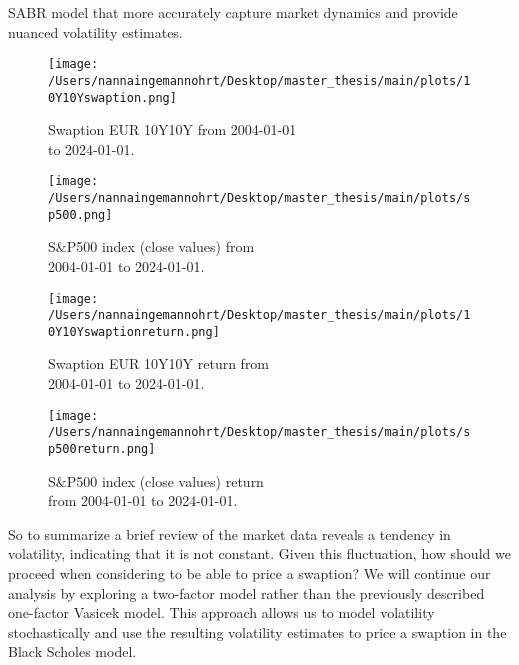 SABR model that more accurately capture market dynamics and provide nuanced volatility estimates.
\begin{figure}[H]
    \centering
    \begin{minipage}{0.5\textwidth}
        \texttt{[image: /Users/nannaingemannohrt/Desktop/master\_thesis/main/plots/10Y10Yswaption.png]}
        \caption{Swaption EUR 10Y10Y from  2004-01-01 \\ to 2024-01-01.}
        \label{10Y10Y dev}
    \end{minipage}\hfill 
    \begin{minipage}{0.5\textwidth}
        \texttt{[image: /Users/nannaingemannohrt/Desktop/master\_thesis/main/plots/sp500.png]}
        \caption{S$\&$P500 index (close values) from \\ 2004-01-01 to 2024-01-01.}
        \label{sp500 dev}
    \end{minipage}
\end{figure}

\begin{figure}[H]
    \centering
    \begin{minipage}{0.5\textwidth}
        \texttt{[image: /Users/nannaingemannohrt/Desktop/master\_thesis/main/plots/10Y10Yswaptionreturn.png]}
        \caption{Swaption EUR 10Y10Y return from  \\ 2004-01-01 to 2024-01-01.}
        \label{10Y10Y return}
    \end{minipage}\hfill 
    \begin{minipage}{0.5\textwidth}
        \texttt{[image: /Users/nannaingemannohrt/Desktop/master\_thesis/main/plots/sp500return.png]}
        \caption{S$\&$P500 index (close values) return  \\ from 2004-01-01 to 2024-01-01.}
        \label{sp500 return}
    \end{minipage}
\end{figure}
\noindent
So to summarize a brief review of the market data reveals a tendency in 
volatility, indicating that it is not constant. 
Given this fluctuation, how should we proceed when 
considering to be able to price a swaption? We will continue our 
analysis by exploring a two-factor model rather 
than the previously described one-factor Vasicek model. 
This approach allows us to model volatility 
stochastically and use the resulting volatility 
estimates to price a swaption in the Black Scholes model. 
